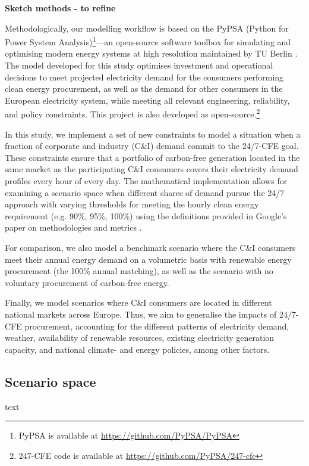 \textbf{Sketch methods - to refine}

Methodologically, our modelling workflow is based on the PyPSA (Python for Power System Analysis)\footnote{PyPSA is available at \url{https://github.com/PyPSA/PyPSA}}—an open-source software toolbox for simulating and optimising modern energy systems at high resolution maintained by TU Berlin \cite{Brown-PyPSA,HORSCH-PyPSAEUR}. 
The model developed for this study optimises investment and operational decisions to meet projected electricity demand for the consumers performing clean energy procurement, as well as the demand for other consumers in the European electricity system, while meeting all relevant engineering, reliability, and policy constraints. 
This project is also developed as open-source.\footnote{247-CFE code is available at  \url{https://github.com/PyPSA/247-cfe}}

In this study, we implement a set of new constraints to model a situation when a fraction of corporate and industry (C\&I) demand commit to the 24/7-CFE goal. 
These constraints ensure that a portfolio of carbon-free generation located in the same market as the participating C\&I consumers covers their electricity demand profiles every hour of every day. 
The mathematical implementation allows for examining a scenario space when different shares of demand pursue the 24/7 approach with varying thresholds for meeting the hourly clean energy requirement (e.g. 90\%, 95\%, 100\%) using the definitions provided in Google's paper on methodologies and metrics \cite{Google-methods}.

For comparison, we also model a benchmark scenario where the C\&I consumers meet their annual energy demand on a volumetric basis with renewable energy procurement (the 100\% annual matching), as well as the scenario with no voluntary procurement of carbon-free energy.

Finally, we model scenarios where C\&I consumers are located in different national markets across Europe. 
Thus, we aim to generalise the impacts of 24/7-CFE procurement, accounting for the different patterns of electricity demand, weather, availability of renewable resources, existing electricity generation capacity, and national climate- and energy policies, among other factors.

\subsection{Scenario space}
\label{subsec:scenarios}
text